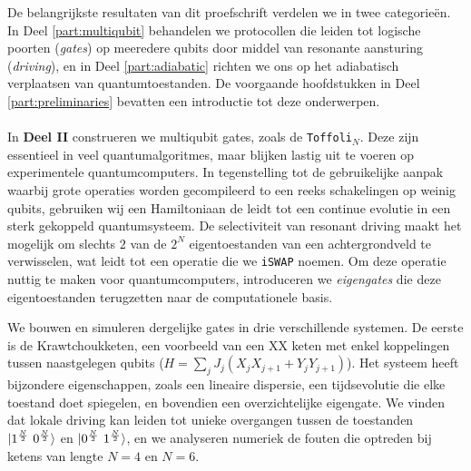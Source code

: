 De belangrijkste resultaten van dit proefschrift verdelen we in twee categorie\"{e}n. In Deel \ref{part:multiqubit} behandelen we protocollen die leiden tot logische poorten (\emph{gates}) op meeredere qubits door middel van resonante aansturing (\emph{driving}), en in Deel \ref{part:adiabatic} richten we ons op het adiabatisch verplaatsen van quantumtoestanden. De voorgaande hoofdstukken in Deel \ref{part:preliminaries} bevatten een introductie tot deze onderwerpen. 

\paragraph{} In \textbf{Deel II} construeren we multiqubit gates, zoals de \texttt{Toffoli}$_N$. Deze zijn essentieel in veel quantumalgoritmes, maar blijken lastig uit te voeren op experimentele quantumcomputers. In tegenstelling tot de gebruikelijke aanpak waarbij grote operaties worden gecompileerd to een reeks schakelingen op weinig qubits, gebruiken wij een Hamiltoniaan de leidt tot een continue evolutie in een sterk gekoppeld quantumsysteem. De selectiviteit van resonant driving maakt het mogelijk om slechts $2$ van de $2^N$ eigentoestanden van een achtergrondveld te verwisselen, wat leidt tot een operatie die we \texttt{iSWAP} noemen. Om deze operatie nuttig te maken voor quantumcomputers, introduceren we \emph{eigengates} die deze eigentoestanden terugzetten naar de computationele basis. 

We bouwen en simuleren dergelijke gates in drie verschillende systemen. De eerste is de Krawtchoukketen, een voorbeeld van een XX keten met enkel koppelingen tussen naastgelegen qubits ($H = \sum_{j} J_j \left( X_j X_{j+1} + Y_j Y_{j+1} \right)$). Het systeem heeft bijzondere eigenschappen, zoals een lineaire dispersie, een tijdsevolutie die elke toestand doet spiegelen, en bovendien een overzichtelijke eigengate. We vinden dat lokale driving kan leiden tot unieke overgangen tussen de toestanden $\lvert1^\frac{N}{2} ~ 0^\frac{N}{2}\rangle$ en $\lvert0^\frac{N}{2} ~ 1^\frac{N}{2}\rangle$, en we analyseren numeriek de fouten die optreden bij ketens van lengte $N=4$ en $N=6$. 



